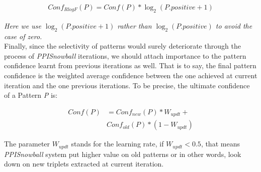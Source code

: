 \begin{equation}
\begin{aligned}
Conf_{RlogF}(P)=Conf(P)*\log_{2}(P.positive+1)
\end{aligned}
\end{equation}

\emph{Here we use $\log_{2}(P.positive+1)$ rather than $\log_{2}(P.positive)$ to avoid the case of zero.} \\

Finally, since the selectivity of patterns would surely deteriorate through the process of \emph{PPISnowball} iterations, we should attach importance to the pattern confidence learnt from previous iterations as well. That is to say, the final pattern confidence is the weighted average confidence between the one achieved at current iteration and the one previous iterations. To be precise, the ultimate confidence of a Pattern \emph{P} is:

\begin{equation}
\begin{aligned}
Conf(P)&=Conf_{new}(P)*W_{updt}+ \\
&Conf_{old}(P)*(1-W_{updt})
\label{eq:ultraConf}
\end{aligned}
\end{equation}

The parameter $W_{updt}$ stands for the learning rate, if $W_{updt}<0.5$, that means \emph{PPISnowball} system put higher value on old patterns or in other words, look down on new triplets extracted at current iteration.
